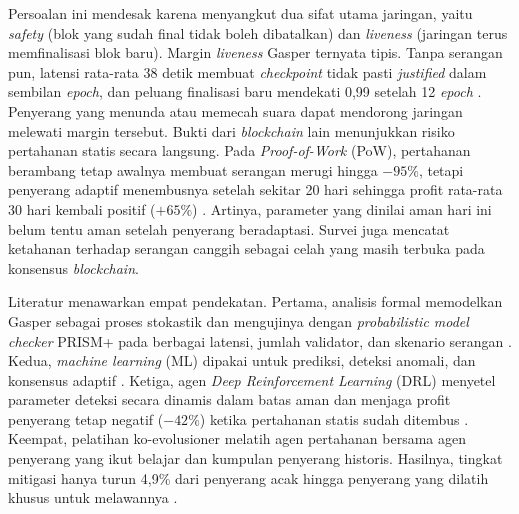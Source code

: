 Persoalan ini mendesak karena menyangkut dua sifat utama jaringan, yaitu \textit{safety} (blok yang sudah final tidak boleh dibatalkan) dan \textit{liveness} (jaringan terus memfinalisasi blok baru). Margin \textit{liveness} Gasper ternyata tipis. Tanpa serangan pun, latensi rata-rata 38 detik membuat \textit{checkpoint} tidak pasti \textit{justified} dalam sembilan \textit{epoch}, dan peluang finalisasi baru mendekati 0,99 setelah 12 \textit{epoch} \parencite{laneve2025stochastic}. Penyerang yang menunda atau memecah suara dapat mendorong jaringan melewati margin tersebut. Bukti dari \textit{blockchain} lain menunjukkan risiko pertahanan statis secara langsung. Pada \textit{Proof-of-Work} (PoW), pertahanan berambang tetap awalnya membuat serangan merugi hingga $-95\%$, tetapi penyerang adaptif menembusnya setelah sekitar 20 hari sehingga profit rata-rata 30 hari kembali positif ($+65\%$) \parencite{skowronski2026adaptive}. Artinya, parameter yang dinilai aman hari ini belum tentu aman setelah penyerang beradaptasi. Survei \textcite{rizal2025enhancing} juga mencatat ketahanan terhadap serangan canggih sebagai celah yang masih terbuka pada konsensus \textit{blockchain}.

Literatur menawarkan empat pendekatan. Pertama, analisis formal memodelkan Gasper sebagai proses stokastik dan mengujinya dengan \textit{probabilistic model checker} PRISM+ pada berbagai latensi, jumlah validator, dan skenario serangan \parencite{laneve2025stochastic}. Kedua, \textit{machine learning} (ML) dipakai untuk prediksi, deteksi anomali, dan konsensus adaptif \parencite{rizal2025enhancing}. Ketiga, agen \textit{Deep Reinforcement Learning} (DRL) menyetel parameter deteksi secara dinamis dalam batas aman dan menjaga profit penyerang tetap negatif ($-42\%$) ketika pertahanan statis sudah ditembus \parencite{skowronski2026adaptive}. Keempat, pelatihan ko-evolusioner melatih agen pertahanan bersama agen penyerang yang ikut belajar dan kumpulan penyerang historis. Hasilnya, tingkat mitigasi hanya turun 4,9\% dari penyerang acak hingga penyerang yang dilatih khusus untuk melawannya \parencite{wushishi2026coadam}.

